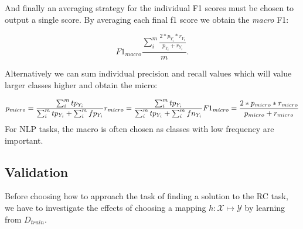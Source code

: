 \begin{center}
\end{center}

And finally an averaging strategy for the individual F1 scores must be chosen to output a single score. By averaging each final f1 score we obtain the \emph{macro} F1: 

$$ 
F1_{macro} \frac{\sum_{i}^{m} \frac{2 * p_{Y_i} * r_{Y_i}}{p_{Y_i} + r_{Y_i}}}{m}. 
$$

Alternatively we can sum individual precision and recall values which will value larger classes higher and obtain the micro:

$$
p_{micro} = \frac{\sum_{i}^{m} tp_{Y_i} } {\sum_{i}^{m} tp_{Y_i}+\sum_{i}^{m} fp_{Y_i}} \\
r_{micro} = \frac{\sum_{i}^{m} tp_{Y_i} } {\sum_{i}^{m} tp_{Y_i}+\sum_{i}^{m} fn_{Y_i}} \\
F1_{micro} = \frac{2 * p_{micro} * r_{micro}}{p_{micro} + r_{micro}} \\
$$
For NLP tasks, the macro is often chosen as classes with low frequency are important. 

\subsection{Validation}

Before choosing how to approach the task of finding a solution to the RC task, we have to investigate the effects of choosing a mapping $h:\mathcal{X}\mapsto\mathcal{Y}$ by learning from $D_{train}$. 





